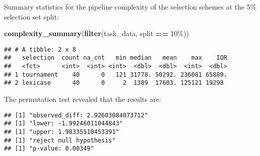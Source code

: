 \documentclass[
]{book}
\newenvironment{Shaded}{\begin{snugshade}}{\end{snugshade}}
\newcommand{\AttributeTok}[1]{\textcolor[rgb]{0.13,0.29,0.53}{#1}}
\newcommand{\DecValTok}[1]{\textcolor[rgb]{0.00,0.00,0.81}{#1}}
\newcommand{\FunctionTok}[1]{\textcolor[rgb]{0.13,0.29,0.53}{\textbf{#1}}}
\newcommand{\NormalTok}[1]{#1}
\newcommand{\OtherTok}[1]{\textcolor[rgb]{0.56,0.35,0.01}{#1}}
\newcommand{\SpecialCharTok}[1]{\textcolor[rgb]{0.81,0.36,0.00}{\textbf{#1}}}
\newcommand{\StringTok}[1]{\textcolor[rgb]{0.31,0.60,0.02}{#1}}
\begin{document}
Summary statistics for the pipeline complexity of the selection schemes at the 5\% selection set split:

\begin{Shaded}
\begin{Highlighting}[]
\FunctionTok{complexity\_summary}\NormalTok{(}\FunctionTok{filter}\NormalTok{(task\_data, split }\SpecialCharTok{==} \StringTok{\textquotesingle{}10\%\textquotesingle{}}\NormalTok{))}
\end{Highlighting}
\end{Shaded}

\begin{verbatim}
## # A tibble: 2 x 8
##   selection  count na_cnt   min median   mean    max    IQR
##   <fct>      <int>  <int> <int>  <dbl>  <dbl>  <int>  <dbl>
## 1 tournament    40      0   121 31778. 50292. 236081 65889.
## 2 lexicase      40      0     2  1389  17603. 125121 19298
\end{verbatim}

The permutation test revealed that the results are:

\begin{Shaded}
\end{Shaded}

\begin{verbatim}
## [1] "observed_diff: 2.92603084073712"
## [1] "lower: -1.99246011044843"
## [1] "upper: 1.98335510453391"
## [1] "reject null hypothesis"
## [1] "p-value: 0.00349"
\end{verbatim}
\end{document}
